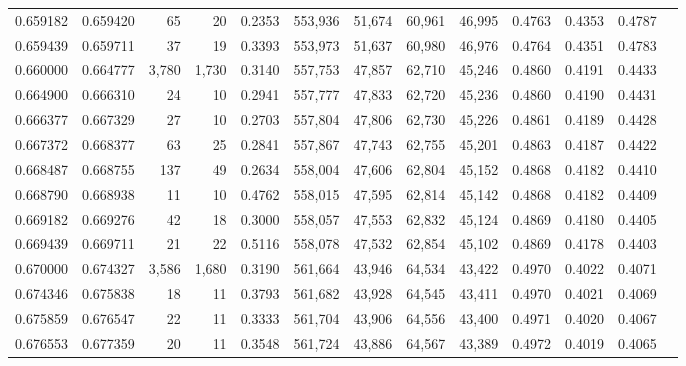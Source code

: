 \begin{tabular}{rrrrrrrrrrrrr}
0.659182 & 0.659420 &     65 &    20 &                                     0.2353 & 553,936 &  51,674 &  60,961 &  46,995 & 0.4763 & 0.4353 & 0.4787 \\
0.659439 & 0.659711 &     37 &    19 &                                     0.3393 & 553,973 &  51,637 &  60,980 &  46,976 & 0.4764 & 0.4351 & 0.4783 \\
0.660000 & 0.664777 &  3,780 & 1,730 &                                     0.3140 & 557,753 &  47,857 &  62,710 &  45,246 & 0.4860 & 0.4191 & 0.4433 \\
0.664900 & 0.666310 &     24 &    10 &                                     0.2941 & 557,777 &  47,833 &  62,720 &  45,236 & 0.4860 & 0.4190 & 0.4431 \\
0.666377 & 0.667329 &     27 &    10 &                                     0.2703 & 557,804 &  47,806 &  62,730 &  45,226 & 0.4861 & 0.4189 & 0.4428 \\
0.667372 & 0.668377 &     63 &    25 &                                     0.2841 & 557,867 &  47,743 &  62,755 &  45,201 & 0.4863 & 0.4187 & 0.4422 \\
0.668487 & 0.668755 &    137 &    49 &                                     0.2634 & 558,004 &  47,606 &  62,804 &  45,152 & 0.4868 & 0.4182 & 0.4410 \\
0.668790 & 0.668938 &     11 &    10 &                                     0.4762 & 558,015 &  47,595 &  62,814 &  45,142 & 0.4868 & 0.4182 & 0.4409 \\
0.669182 & 0.669276 &     42 &    18 &                                     0.3000 & 558,057 &  47,553 &  62,832 &  45,124 & 0.4869 & 0.4180 & 0.4405 \\
0.669439 & 0.669711 &     21 &    22 &                                     0.5116 & 558,078 &  47,532 &  62,854 &  45,102 & 0.4869 & 0.4178 & 0.4403 \\
0.670000 & 0.674327 &  3,586 & 1,680 &                                     0.3190 & 561,664 &  43,946 &  64,534 &  43,422 & 0.4970 & 0.4022 & 0.4071 \\
0.674346 & 0.675838 &     18 &    11 &                                     0.3793 & 561,682 &  43,928 &  64,545 &  43,411 & 0.4970 & 0.4021 & 0.4069 \\
0.675859 & 0.676547 &     22 &    11 &                                     0.3333 & 561,704 &  43,906 &  64,556 &  43,400 & 0.4971 & 0.4020 & 0.4067 \\
0.676553 & 0.677359 &     20 &    11 &                                     0.3548 & 561,724 &  43,886 &  64,567 &  43,389 & 0.4972 & 0.4019 & 0.4065 \\

\end{tabular}
